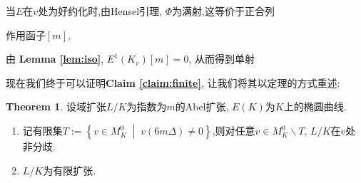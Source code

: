\documentclass[12pt,A4paper,oneside,reqno]{amsart}
\numberwithin{equation}{section}
\theoremstyle{definition}
\newtheorem{theorem}{Theorem}[section]
\theoremstyle{plain}
\theoremstyle{plain}
\numberwithin{equation}{section}
\theoremstyle{remark}
\begin{document}
	当$E$在$v$处为好约化时,由Hensel引理, $\Phi$为满射,这等价于正合列
	\begin{center}
	\end{center}
作用函子$[m]$,
	\begin{center}
	\end{center}	
由 \textbf{Lemma \ref{lem:iso}}, $E^1(K_v)[m]=0$, 从而得到单射
	\begin{center}
	\end{center}
现在我们终于可以证明\textbf{Claim \ref{claim:finite}}, 让我们将其以定理的方式重述:
\begin{theorem}
	设域扩张$L/K$为指数为$m$的Abel扩张, $E(K)$为$K$上的椭圆曲线.
	\begin{enumerate}[1.]
		\item 记有限集$T:=\left\{v \in M_K^0 \;\middle|\; v(6m\Delta) \neq 0 \right\}$,则对任意$v \in M_K^{0} \smallsetminus T$, $L/K$在$v$处非分歧.
		\item $L/K$为有限扩张.
	\end{enumerate}
\end{theorem}
\end{document}
